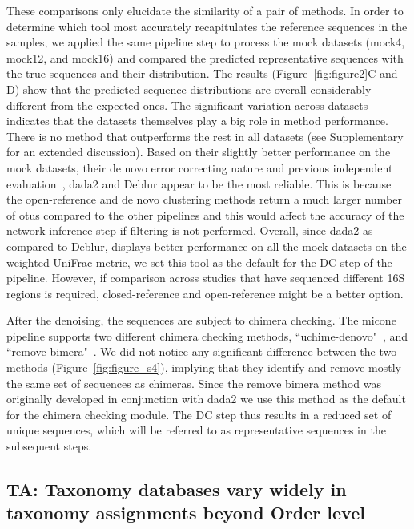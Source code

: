   These comparisons only elucidate the similarity of a pair of methods.
  In order to determine which tool most accurately recapitulates the reference sequences in the samples, we applied the same pipeline step to process the mock datasets (mock4, mock12, and mock16) and compared the predicted representative sequences with the true sequences and their distribution.
  The results (Figure~\ref{fig:figure2}C and D) show that the predicted sequence distributions are overall considerably different from the expected ones.
  The significant variation across datasets indicates that the datasets themselves play a big role in method performance.
  There is no method that outperforms the rest in all datasets (see Supplementary for an extended discussion).
  Based on their slightly better performance on the mock datasets, their de novo error correcting nature and previous independent evaluation~\cite{Nearing2018}, \ac{dada2} and Deblur appear to be the most reliable.
  This is because the open-reference and de novo clustering methods return a much larger number of \ac{otu}s compared to the other pipelines and this would affect the accuracy of the network inference step if filtering is not performed.
  Overall, since \ac{dada2} as compared to Deblur, displays better performance on all the mock datasets on the weighted UniFrac metric, we set this tool as the default for the DC step of the pipeline.
  However, if comparison across studies that have sequenced different 16S regions is required, closed-reference and open-reference might be a better option.

  After the denoising, the sequences are subject to chimera checking.
  The \ac{micone} pipeline supports two different chimera checking methods, ``uchime-denovo"~\cite{bolyenReproducibleInteractiveScalable2019}, and ``remove bimera"~\cite{Callahan2016}.
  We did not notice any significant difference between the two methods (Figure~\ref{fig:figure_s4}), implying that they identify and remove mostly the same set of sequences as chimeras.
  Since the remove bimera method was originally developed in conjunction with dada2 we use this method as the default for the chimera checking module.
  The DC step thus results in a reduced set of unique sequences, which will be referred to as representative sequences in the subsequent steps.

  \FloatBarrier

  \subsection*{TA: Taxonomy databases vary widely in taxonomy assignments beyond Order level}

